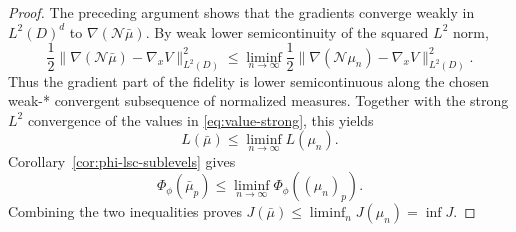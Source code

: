 \documentclass[11pt]{amsart}
\theoremstyle{definition}
\theoremstyle{remark}
\begin{document}
\begin{proof}
The preceding argument shows that the gradients converge weakly in
$L^2(D)^d$ to $\nabla(\mathcal N\bar\mu)$. By weak lower semicontinuity of
the squared $L^2$ norm,
\begin{equation*}
	\frac12\|\nabla(\mathcal N\bar\mu)-\nabla_x V\|_{L^2(D)}^2
	\le\liminf_{n\to\infty}
	\frac12\|\nabla(\mathcal N\mu_n)-\nabla_x V\|_{L^2(D)}^2.
\end{equation*}
Thus the gradient part of the fidelity is lower semicontinuous along the
chosen weak-* convergent subsequence of normalized measures. Together with
the strong $L^2$ convergence of the values in \eqref{eq:value-strong}, this
yields
\begin{equation*}
	L(\bar\mu)\le\liminf_{n\to\infty}L(\mu_n).
\end{equation*}
Corollary~\ref{cor:phi-lsc-sublevels} gives
\begin{equation*}
	\Phi_\phi(\bar\mu_p)
	\le\liminf_{n\to\infty}\Phi_\phi((\mu_n)_p).
\end{equation*}
Combining the two inequalities proves
$J(\bar\mu)\le\liminf_nJ(\mu_n)=\inf J$.
\end{proof}
\end{document}
